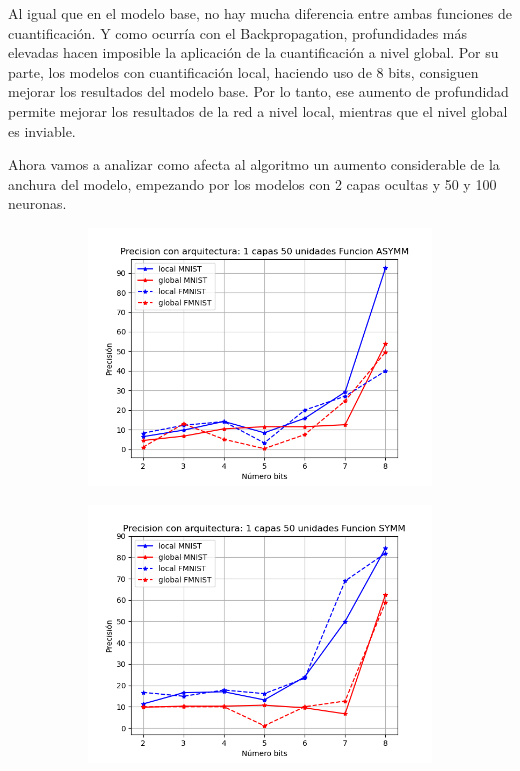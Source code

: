 Al igual que en el modelo base, no hay mucha diferencia entre ambas funciones de cuantificación. Y como ocurría con el Backpropagation, profundidades más elevadas hacen imposible la aplicación de la cuantificación a nivel global. Por su parte, los modelos con cuantificación local, haciendo uso de 8 bits, consiguen mejorar los resultados del modelo base. Por lo tanto, ese aumento de profundidad permite mejorar los resultados de la red a nivel local, mientras que el nivel global es inviable.

Ahora vamos a analizar como afecta al algoritmo un aumento considerable de la anchura del modelo, empezando por los modelos con 2 capas ocultas y 50 y 100 neuronas.

\begin{figure}[H]
    \centering
    \begin{subfigure}[H]{0.475\textwidth}
    \includegraphics[width=\textwidth]{imagenes/HSIC/Precision con arquitectura: 1 capas 50 unidades Funcion ASYMM.png}
    \end{subfigure}
    \begin{subfigure}[H]{0.475\textwidth}
    \includegraphics[width=\textwidth]{imagenes/HSIC/Precision con arquitectura: 1 capas 50 unidades Funcion SYMM.png}

\end{subfigure}
\end{figure}
